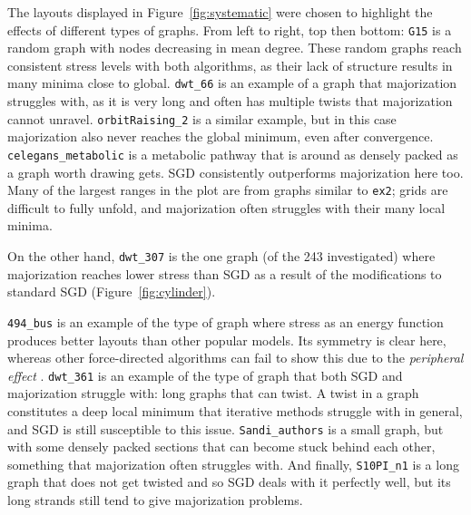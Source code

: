 The layouts displayed in Figure~\ref{fig:systematic} were chosen to highlight the effects of different types of graphs. From left to right, top then bottom: \texttt{G15} is a random graph with nodes decreasing in mean degree. These random graphs reach consistent stress levels with both algorithms, as their lack of structure results in many minima close to global.
\texttt{dwt\_66} is an example of a graph that majorization struggles with, as it is very long and often has multiple twists that majorization cannot unravel.
\texttt{orbitRaising\_2} is a similar example, but in this case majorization also never reaches the global minimum, even after convergence.
\texttt{celegans\_metabolic} is a metabolic pathway that is around as densely packed as a graph worth drawing gets.
SGD consistently outperforms majorization here too.
Many of the largest ranges in the plot are from graphs similar to \texttt{ex2}; grids are difficult to fully unfold, and majorization often struggles with their many local minima.

On the other hand, \texttt{dwt\_307} is the one graph (of the 243 investigated) where majorization reaches lower stress than SGD as a result of the modifications to standard SGD (Figure~\ref{fig:cylinder}).

\texttt{494\_bus} is an example of the type of graph where stress as an energy function produces better layouts than other popular models. Its symmetry is clear here, whereas other force-directed algorithms can fail to show this due to the \emph{peripheral effect} \cite{Hu2005}.
\texttt{dwt\_361} is an example of the type of graph that both SGD and majorization struggle with: long graphs that can twist. A twist in a graph constitutes a deep local minimum that iterative methods struggle with in general, and SGD is still susceptible to this issue.
\texttt{Sandi\_authors} is a small graph, but with some densely packed sections that can become stuck behind each other, something that majorization often struggles with.
And finally, \texttt{S10PI\_n1} is a long graph that does not get twisted and so SGD deals with it perfectly well, but its long strands still tend to give majorization problems.

